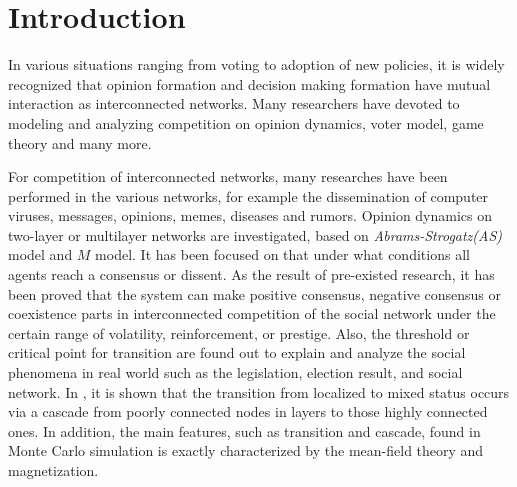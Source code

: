 \documentclass[english]{cccconf}
\begin{document}


\section{Introduction}
In various situations ranging from voting to adoption of new policies, it is widely recognized that opinion formation and decision making formation have mutual interaction as interconnected networks\cite{bianconi2018,domenico2013,tomasini2015, kimsangwoo2012,newman2010,boccaletti2014,mikko2013,huberman2004}. Many researchers have devoted to modeling and analyzing competition on opinion dynamics\cite{amato2017,quattrociocchi2014,haibo2017, hua2014}, voter model\cite{redner2017}, game theory\cite{smyrnakis2019} and many more\cite{danziger2019,namkhanhvu2017,laguna2004,masuda2015,zuev2012, shenyu2018}.  
 
For competition of interconnected networks, many researches have been performed in the various networks, for example the dissemination of computer viruses, messages, opinions, memes, diseases and rumors\cite{bianconi2018,hua2014,shenyu2018,alvarez2016,gomez2015,diep2017,rocca2014,velasquez2018}. Opinion dynamics on two-layer or multilayer networks are investigated, based on \textit{Abrams-Strogatz(AS)} model\cite{abrams2003,vazquez2010} and $M$ model\cite{rocca2014}. It has been focused on that under what conditions all agents reach a consensus or dissent. As the result of pre-existed research, it has been proved that the system can make positive consensus, negative consensus or coexistence parts in interconnected competition of the social network under the certain range of volatility, reinforcement, or prestige. Also, the threshold or critical point for transition are found out to explain and analyze the social phenomena in real world such as the legislation, election result, and social network\cite{alvarez2016, amato2017, diep2017}. In \cite{gomez2015}, it is shown that the transition from localized to mixed status occurs via a cascade from poorly connected nodes in layers to those highly connected ones. In addition, the main features, such as transition and cascade, found in Monte Carlo simulation is exactly characterized by the mean-field theory and magnetization\cite{alvarez2016, diep2017, amato2017, gomez2015}.   
\end{document}

